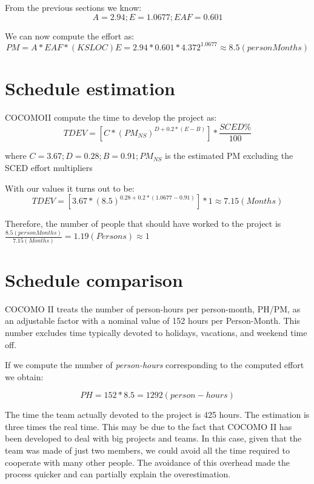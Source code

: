 \documentclass[10pt,a4paper,titlepage]{article}
\begin{document}
From the previous sections we know:
\[A=2.94; E=1.0677; EAF=0.601\]

We can now compute the effort as:
\[PM = A * EAF * (KSLOC)E = 2.94 * 0.601 * 4.372^{1.0677} \approx 8.5 (personMonths)\]

\section{Schedule estimation}
COCOMOII compute the time to develop the project as:
\[TDEV = [C * (PM_{NS})^{D+0.2*(E-B)}] * \frac{SCED\%}{100} \]
\begin{center}
where $C=3.67; D=0.28; B=0.91; PM_{NS}$ is the estimated PM excluding the SCED effort multipliers
\end{center}

With our values it turns out to be:
\[TDEV = [3.67 * (8.5)^{0.28+0.2*(1.0677-0.91)}]*1 \approx 7.15 (Months)\]

Therefore, the number of people that should have worked to the project is $\frac{8.5 (personMonths)}{7.15 (Months)} = 1.19 (Persons) \approx 1$

\section{Schedule comparison}
COCOMO II treats the number of person-hours per person-month, PH/PM, as an adjustable factor with a nominal value of 152 hours per Person-Month. This number excludes time typically devoted to holidays, vacations, and weekend time off.

If we compute the number of \textit{person-hours} corresponding to the computed effort we obtain:

\[PH = 152 * 8.5 = 1292(person-hours)\]

The time the team actually devoted to the project is 425 hours.
The estimation is three times the real time. This may be due to the fact that COCOMO II has been developed to deal with big projects and teams. In this case, given that the team was made of just two members, we could avoid all the time required to cooperate with many other people. The avoidance of this overhead made the process quicker and can partially explain the overestimation.
\end{document}
